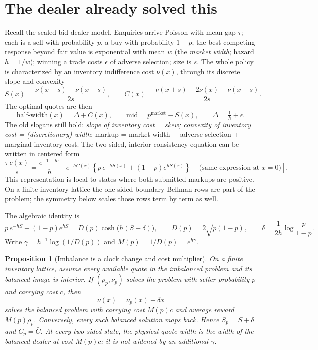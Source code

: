 \documentclass[11pt]{article}
\newtheorem{proposition}{Proposition}
\begin{document}
\section{The dealer already solved this}\label{sec:dealer}

Recall the sealed-bid dealer model. Enquiries arrive Poisson with mean gap $\tau$; each is a sell with probability $p$, a buy with probability $1-p$; the best competing response beyond fair value is exponential with mean $w$ (the \emph{market width}; hazard $h = 1/w$); winning a trade costs $\epsilon$ of adverse selection; size is $s$. The whole policy is characterized by an inventory indifference cost $\nu(x)$, through its discrete slope and convexity
\[
S(x) = \frac{\nu(x+s)-\nu(x-s)}{2s}, \qquad
C(x) = \frac{\nu(x+s)-2\nu(x)+\nu(x-s)}{2s}.
\]
The optimal quotes are then
\begin{equation}
\text{half-width}(x) = \Delta + C(x), \qquad
\text{mid} = p^{\text{market}} - S(x), \qquad \Delta = \tfrac1h + \epsilon .
\label{eq:quotes}
\end{equation}
The old slogans still hold: \emph{slope of inventory cost = skew; convexity of inventory cost = (discretionary) width}; markup = market width + adverse selection + marginal inventory cost. The two-sided, interior consistency equation can be written in centered form
\begin{equation}
\frac{\tau\, c(x)}{s}
= \frac{e^{-1-h\epsilon}}{h}\,
\left[
 e^{-hC(x)}
 \left\{p\,e^{-hS(x)}+(1-p)e^{hS(x)}\right\}
-\big(\text{same expression at }x=0\big)
\right].
\label{eq:bellman}
\end{equation}
This representation is local to states where both submitted markups are positive. On a finite inventory lattice the one-sided boundary Bellman rows are part of the problem; the symmetry below scales those rows term by term as well.

The algebraic identity is
\begin{equation}
p\,e^{-hS}+(1-p)e^{hS}
= D(p)\cosh\!\big(h(S-\delta)\big),\qquad
D(p)=2\sqrt{p(1-p)},\qquad
\delta=\frac{1}{2h}\log\frac{p}{1-p}.
\label{eq:imbalanceidentity}
\end{equation}
Write $\gamma=h^{-1}\log(1/D(p))$ and $M(p)=1/D(p)=e^{h\gamma}$.

\begin{proposition}[Imbalance is a clock change and cost multiplier]\label{prop:multiplier}
On a finite inventory lattice, assume every available quote in the imbalanced problem and its balanced image is interior. If $(\rho_p,\nu_p)$ solves the problem with seller probability $p$ and carrying cost $c$, then
\[
\bar\nu(x)=\nu_p(x)-\delta x
\]
solves the balanced problem with carrying cost $M(p)c$ and average reward $M(p)\rho_p$. Conversely, every such balanced solution maps back. Hence $S_p=\bar S+\delta$ and $C_p=\bar C$. At every two-sided state, the physical quote width is the width of the balanced dealer at cost $M(p)c$; it is not widened by an additional $\gamma$.
\end{proposition}
\end{document}

